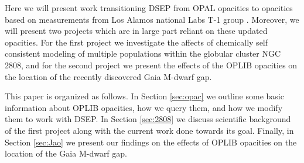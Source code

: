 Here we will present work transitioning DSEP from OPAL opacities to opacities
based on measurements from Los Alamos national Labs T-1 group
\citep[OPLIB][]{Colgan2016}. Moreover, we will present two projects which are
in large part reliant on these updated opacities. For the first project we
investigate the affects of chemically self consistent modeling of multiple
populations within the globular cluster NGC 2808, and for the second project we
present the effects of the OPLIB opacities on the location of the recently
discovered Gaia M-dwarf gap.

This paper is organized as follows. In Section \ref{sec:opac} we outline some
basic information about OPLIB opacities, how we query them, and how we modify
them to work with DSEP. In Section \ref{sec:2808} we discuss scientific
background of the first project along with the current work done towards its
goal. Finally, in Section \ref{sec:Jao} we present our findings on the effects
of OPLIB opacities on the location of the Gaia M-dwarf gap.





